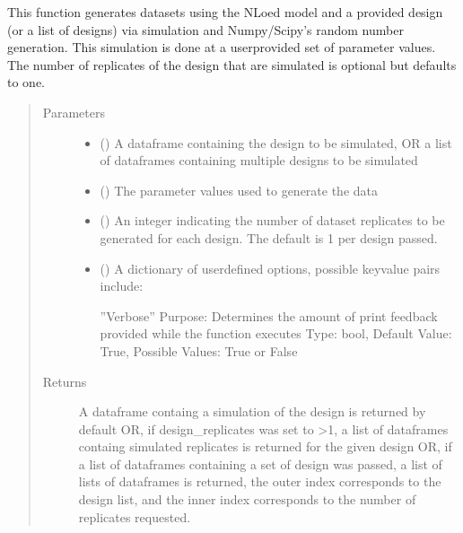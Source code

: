 \documentclass[letterpaper,10pt,english,openany,oneside]{sphinxmanual}
\begin{document}
\begin{fulllineitems}
\begin{fulllineitems}
This function generates datasets using the NLoed model and a provided design (or a list of
designs) via simulation and Numpy/Scipy’s random number generation. This simulation is done
at a user\sphinxhyphen{}provided set of parameter values. The number of replicates of the design that are
simulated is optional but defaults to one.
\begin{quote}\begin{description}
\item[{Parameters}] \leavevmode\begin{itemize}
\item {} 
 () \textendash{} A dataframe containing the design to be simulated,
OR a list of dataframes containing multiple designs to be simulated

\item {} 
 (\sphinxstyleliteralemphasis{\sphinxupquote{, }}) \textendash{} The parameter values used to generate the data

\item {} 
 (\sphinxstyleliteralemphasis{\sphinxupquote{, }}) \textendash{} An integer indicating the number of dataset
replicates to be generated for each design. The default is 1 per design passed.

\item {} 
 (\sphinxstyleliteralemphasis{\sphinxupquote{, }}) \textendash{} 
A dictionary of user\sphinxhyphen{}defined options, possible key\sphinxhyphen{}value pairs
include:

”Verbose” \textendash{}
Purpose: Determines the amount of print feedback provided while the function executes
Type: bool,
Default Value: True,
Possible Values: True or False


\end{itemize}

\item[{Returns}] \leavevmode
A dataframe containg a simulation of the design is returned by default
OR, if design\_replicates was set to \textgreater{}1, a list of dataframes containg simulated
replicates is returned for the given design
OR,  if a list of dataframes containing a set of design was passed,
a list of lists of dataframes is returned, the outer index corresponds to the design
list, and the inner index corresponds to the number of replicates requested.


\end{description}
\end{quote}
\end{fulllineitems}
\end{fulllineitems}
\end{document}
